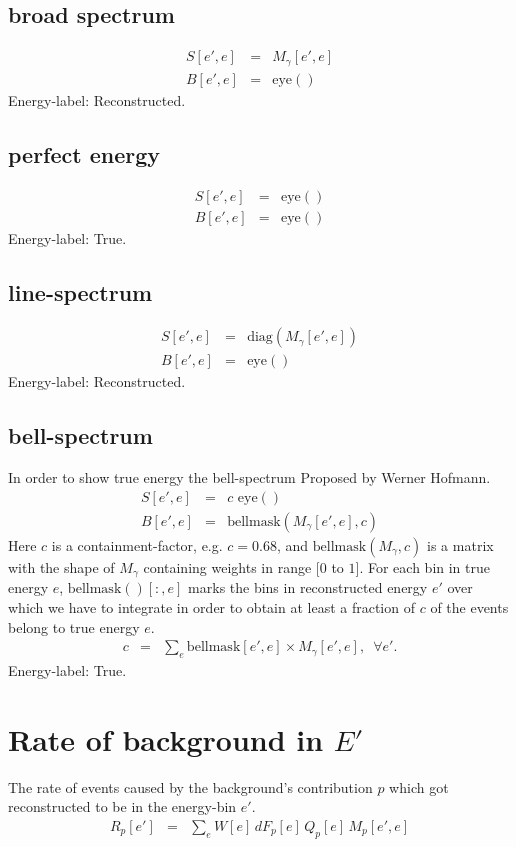 \documentclass{article}%
\begin{document}
\subsection{broad spectrum}
\begin{eqnarray}
S[e', e] &=& M_{\gamma}[e',e]
\\
B[e', e] &=& \mathrm{eye}()
\end{eqnarray}
%
Energy-label: Reconstructed.
%
\subsection{perfect energy}
\begin{eqnarray}
S[e', e] &=& \mathrm{eye}()
\\
B[e', e] &=& \mathrm{eye}()
\end{eqnarray}
%
Energy-label: True.
%
\subsection{line-spectrum}
\begin{eqnarray}
S[e', e] &=& \mathrm{diag}(M_{\gamma}[e',e])
\\
B[e', e] &=& \mathrm{eye}()
\end{eqnarray}
%
Energy-label: Reconstructed.
%
\subsection{bell-spectrum}
%
In order to show true energy the bell-spectrum
%
Proposed by Werner Hofmann.
\begin{eqnarray}
S[e', e] &=& c \, \, \mathrm{eye}()
\\
B[e', e] &=& \mathrm{bellmask}(M_{\gamma}[e',e], c)
\end{eqnarray}
%
Here $c$ is a containment-factor, e.g. $c = 0.68$,
%
and $\mathrm{bellmask}(M_{\gamma}, c)$ is a matrix with the shape of $M_{\gamma}$ containing weights in range $[0$ to $1]$.
%
For each bin in true energy $e$, $\mathrm{bellmask}()[:, e]$ marks the bins in reconstructed energy $e'$ over which we have to integrate in order to obtain at least a fraction of $c$ of the events belong to true energy $e$.
%
\begin{eqnarray}
c &=& \sum_e \mathrm{bellmask}[e',e] \times M_{\gamma}[e', e], \, \, \, \forall e'.
\end{eqnarray}
%
Energy-label: True.
%
\section{Rate of background in $E'$}
%
The rate of events caused by the background's contribution $p$ which got reconstructed to be in the energy-bin $e'$.
%
\begin{eqnarray}
R_p[e'] &=& \sum_{e} W[e] \, dF_p[e] \, Q_p[e] \, M_p[e', e]
\end{eqnarray}
%
\end{document}
